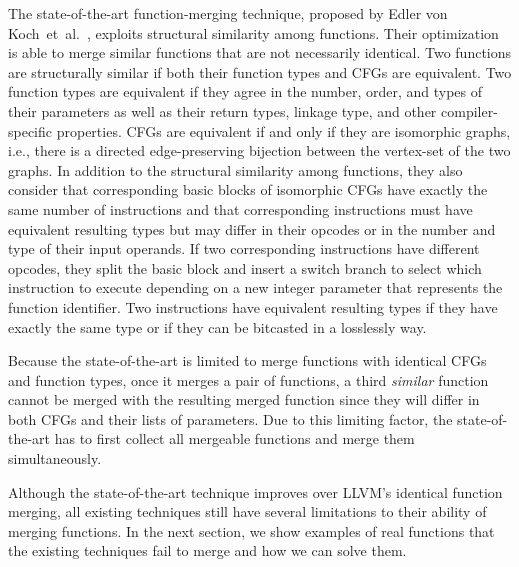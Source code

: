 The state-of-the-art function-merging technique, proposed by Edler von
Koch~et~al.~\cite{edler14}, exploits structural similarity among functions.
Their optimization is able to merge similar functions that are not necessarily
identical.
Two functions are structurally similar if both their function types and
CFGs are equivalent.
Two function types are equivalent
if they agree in the number, order, and types of their parameters as well as
their return types, linkage type, and other compiler-specific properties.
CFGs are equivalent if and only if they are isomorphic graphs, i.e., there is a
directed edge-preserving bijection between the vertex-set of the two graphs.
In addition to the structural similarity among functions, they also consider
that corresponding basic blocks of isomorphic CFGs have exactly the same number
of instructions and that corresponding instructions must have equivalent
resulting types but may differ in their opcodes or in the number and type of
their input operands.
If two corresponding instructions have different opcodes, they split the basic
block and insert a switch branch to select which instruction to execute
depending on a new integer parameter that represents the function identifier.
Two instructions have equivalent resulting types if they have exactly
the same type or if they can be bitcasted in a losslessly way.

Because the state-of-the-art is limited to merge functions with identical CFGs
and function types, once it merges a pair of functions, a third
\textit{similar} function cannot be merged with the resulting merged function
since they will differ in both CFGs and their lists of parameters.
Due to this limiting factor, the state-of-the-art has to first collect all
mergeable functions and merge them simultaneously.

Although the state-of-the-art technique improves over LLVM's identical
function merging, all existing techniques still have several limitations to
their ability of merging functions.
In the next section, we show examples of real functions that the existing
techniques fail to merge and how we can solve them.

